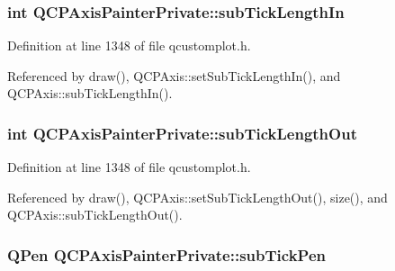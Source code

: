 \hypertarget{class_q_c_p_axis_painter_private_af11f7d83021c9cb3b0e76fe7814c6110}{}
\subsubsection[{sub\+Tick\+Length\+In}]{\setlength{\rightskip}{0pt plus 5cm}int Q\+C\+P\+Axis\+Painter\+Private\+::sub\+Tick\+Length\+In}\label{class_q_c_p_axis_painter_private_af11f7d83021c9cb3b0e76fe7814c6110}


Definition at line 1348 of file qcustomplot.\+h.



Referenced by draw(), Q\+C\+P\+Axis\+::set\+Sub\+Tick\+Length\+In(), and Q\+C\+P\+Axis\+::sub\+Tick\+Length\+In().

\hypertarget{class_q_c_p_axis_painter_private_a5f1afddc3dc7ccc4d5adcbcd8f0c2218}{}
\subsubsection[{sub\+Tick\+Length\+Out}]{\setlength{\rightskip}{0pt plus 5cm}int Q\+C\+P\+Axis\+Painter\+Private\+::sub\+Tick\+Length\+Out}\label{class_q_c_p_axis_painter_private_a5f1afddc3dc7ccc4d5adcbcd8f0c2218}


Definition at line 1348 of file qcustomplot.\+h.



Referenced by draw(), Q\+C\+P\+Axis\+::set\+Sub\+Tick\+Length\+Out(), size(), and Q\+C\+P\+Axis\+::sub\+Tick\+Length\+Out().

\hypertarget{class_q_c_p_axis_painter_private_a9b9cf594cd16575f52ecda9abef4e412}{}
\subsubsection[{sub\+Tick\+Pen}]{\setlength{\rightskip}{0pt plus 5cm}Q\+Pen Q\+C\+P\+Axis\+Painter\+Private\+::sub\+Tick\+Pen}\label{class_q_c_p_axis_painter_private_a9b9cf594cd16575f52ecda9abef4e412}


